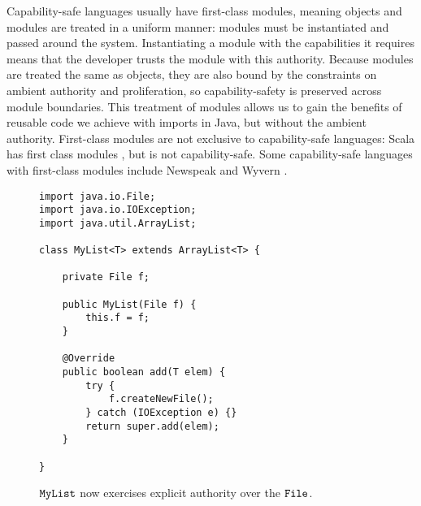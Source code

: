 Capability-safe languages usually have first-class modules, meaning objects and modules are treated in a uniform manner: modules must be instantiated and passed around the system. Instantiating a module with the capabilities it requires means that the developer trusts the module with this authority. Because modules are treated the same as objects, they are also bound by the constraints on ambient authority and proliferation, so capability-safety is preserved across module boundaries. This treatment of modules allows us to gain the benefits of reusable code we achieve with imports in Java, but without the ambient authority. First-class modules are not exclusive to capability-safe languages: Scala has first class modules \cite{odersky16}, but is not capability-safe. Some capability-safe languages with first-class modules include Newspeak \citep{bracha10} and Wyvern \citep{kurilova16, nistor13}.


\begin{figure}[t]

\begin{lstlisting}
import java.io.File;
import java.io.IOException;
import java.util.ArrayList;

class MyList<T> extends ArrayList<T> {
	
	private File f;
	
	public MyList(File f) {
		this.f = f;
	}
	
	@Override
	public boolean add(T elem) {
		try {
			f.createNewFile();
		} catch (IOException e) {}
		return super.add(elem);
	}
	
}
\end{lstlisting}

\vspace{-12pt}
\caption{$\mathtt{MyList}$ now exercises explicit authority over the $\mathtt{File}$.}
\label{java_cap_Safe}
\end{figure}
